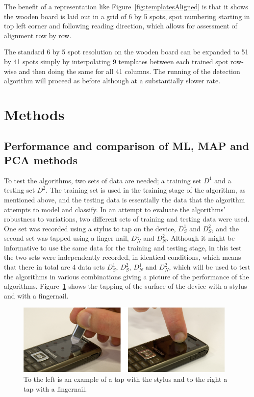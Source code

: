 The benefit of a representation like Figure~\ref{fig:templatesAligned} is that it shows the wooden board is laid out in a grid of 6 by 5 spots, spot numbering starting in top left corner and following reading direction, which allows for assessment of alignment row by row.

The standard 6 by 5 spot resolution on the wooden board can be expanded to 51 by 41 spots simply by interpolating 9 templates between each trained spot row-wise and then doing the same for all 41 columns. The running of the detection algorithm will proceed as before although at a substantially slower rate.

\section{Methods}
\subsection{Performance and comparison of ML, MAP and PCA methods}
To test the algorithms, two sets of data are needed; a training set $D^1$ and a testing set $D^2$. The training set is used in the training stage of the algorithm, as mentioned above, and the testing data is essentially the data that the algorithm attempts to model and classify. In an attempt to evaluate the algorithms' robustness to variations, two different sets of training and testing data were used. One set was recorded using a stylus to tap on the device, $D^1_S$ and $D^2_S$, and the second set was tapped using a finger nail, $D^1_N$ and $D^2_N$. Although it might be informative to use the same data for the training and testing stage, in this test the two sets were independently recorded, in identical conditions, which means that there in total are 4 data sets $D^1_S$, $D^2_S$, $D^1_N$ and $D^2_N$, which will be used to test the algorithms in various combinations giving a picture of the performance of the algorithms. Figure~\ref{fig:tapSN} shows the tapping of the surface of the device with a stylus and with a fingernail.

\begin{figure}[!]
\centering
\includegraphics[width=410 px]{tapSN.png}
\caption{To the left is an example of a tap with the stylus and to the right a tap with a fingernail.}\label{fig:tapSN}
\end{figure}

